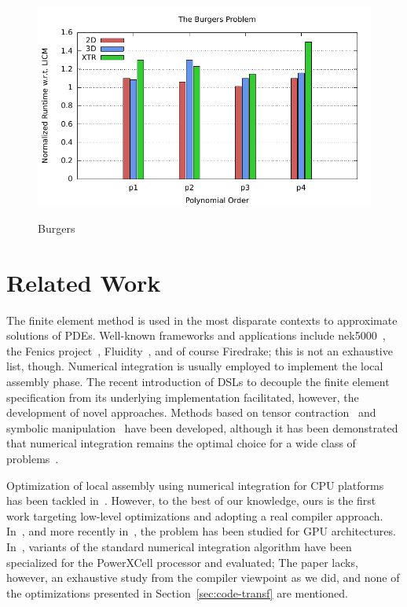 \documentclass[conference]{IEEEtran}
\begin{document}
\begin{figure}[h]
\centerline{\includegraphics[scale=0.7]{Pictures/burgers-normalized.pdf}
\label{fig_first_case}}
\caption{Burgers}
\end{figure}


\section{Related Work}
\label{sec:related-work}
The finite element method is used in the most disparate contexts to approximate solutions of PDEs. Well-known frameworks and applications include nek5000~\cite{nek5000-web-page}, the Fenics project~\cite{Fenics}, Fluidity~\cite{fluidity_manual_v4}, and of course Firedrake; this is not an exhaustive list, though. Numerical integration is usually employed to implement the local assembly phase. The recent introduction of DSLs to decouple the finite element specification from its underlying implementation facilitated, however, the development of novel approaches. Methods based on tensor contraction~\cite{FFC-TC} and symbolic manipulation~\cite{Francis} have been developed, although it has been demonstrated that numerical integration remains the optimal choice for a wide class of problems~\cite{quadrature1}. 

Optimization of local assembly using numerical integration for CPU platforms has been tackled in~\cite{quadrature1}. However, to the best of our knowledge, ours is the first work targeting low-level optimizations and adopting a real compiler approach. In~\cite{Markall20101815}, and more recently in~\cite{petsc-integration-gpu}, the problem has been studied for GPU architectures. In~\cite{assembly-opencl}, variants of the standard numerical integration algorithm have been specialized for the PowerXCell processor and evaluated; The paper lacks, however, an exhaustive study from the compiler viewpoint as we did, and none of the optimizations presented in Section~\ref{sec:code-transf} are mentioned. 
\end{document}
